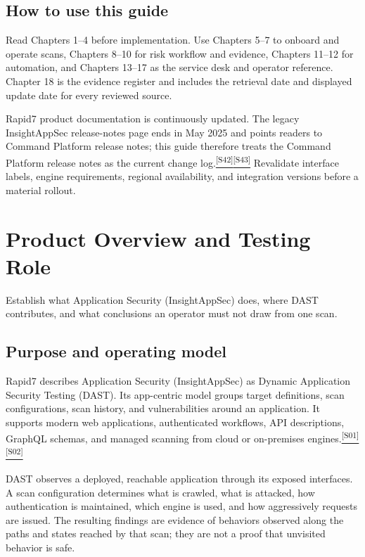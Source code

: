 \documentclass[11pt,letterpaper,oneside]{scrreprt}
\newcommand{\src}[1]{\hyperref[src:#1]{\textsuperscript{\color{R7Orange}[#1]}}}
\newcommand{\chapterlead}[1]{\begin{tcolorbox}[enhanced,colback=R7Light,colframe=R7Light,boxrule=0pt,borderline west={3pt}{0pt}{R7Orange},arc=0pt,left=9pt,right=9pt,top=7pt,bottom=7pt]#1\end{tcolorbox}}
\begin{document}
\section*{How to use this guide}
Read Chapters 1--4 before implementation. Use Chapters 5--7 to onboard and operate scans, Chapters 8--10 for risk workflow and evidence, Chapters 11--12 for automation, and Chapters 13--17 as the service desk and operator reference. Chapter 18 is the evidence register and includes the retrieval date and displayed update date for every reviewed source.

\begin{docgap}
Rapid7 product documentation is continuously updated. The legacy InsightAppSec release-notes page ends in May 2025 and points readers to Command Platform release notes; this guide therefore treats the Command Platform release notes as the current change log.\src{S42}\src{S43} Revalidate interface labels, engine requirements, regional availability, and integration versions before a material rollout.
\end{docgap}

\tableofcontents
\clearpage
{}

\chapter{Product Overview and Testing Role}
\chapterlead{Establish what Application Security (InsightAppSec) does, where DAST contributes, and what conclusions an operator must not draw from one scan.}

\section{Purpose and operating model}
Rapid7 describes Application Security (InsightAppSec) as Dynamic Application Security Testing (DAST). Its app-centric model groups target definitions, scan configurations, scan history, and vulnerabilities around an application. It supports modern web applications, authenticated workflows, API descriptions, GraphQL schemas, and managed scanning from cloud or on-premises engines.\src{S01}\src{S02}

DAST observes a deployed, reachable application through its exposed interfaces. A scan configuration determines what is crawled, what is attacked, how authentication is maintained, which engine is used, and how aggressively requests are issued. The resulting findings are evidence of behaviors observed along the paths and states reached by that scan; they are not a proof that unvisited behavior is safe.
\end{document}
